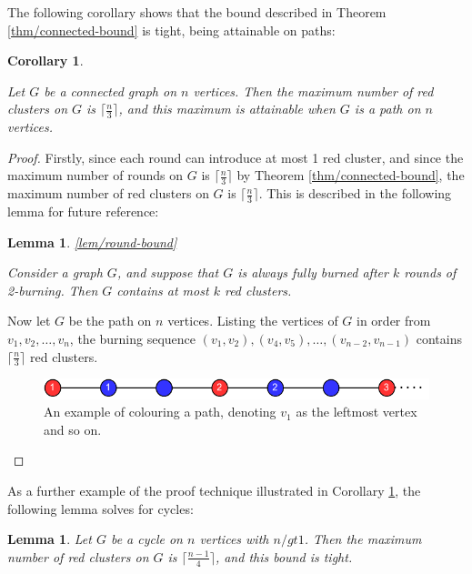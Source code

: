 \documentclass{mpaper}
\newtheorem{corollary}[theorem]{Corollary}
\newtheorem{lemma}[theorem]{Lemma}
\begin{document}
The following corollary shows that the bound described in Theorem \ref{thm/connected-bound} is tight, being attainable on paths:

\begin{corollary}
  \label{cor/path-clusters}

  Let $G$ be a connected graph on $n$ vertices. Then the maximum number of red clusters on $G$ is $\lceil \frac{n}{3} \rceil$, and this maximum is attainable when $G$ is a path on $n$ vertices.

\end{corollary}

\begin{proof}

Firstly, since each round can introduce at most 1 red cluster, and since the maximum number of rounds on $G$ is $\lceil \frac{n}{3} \rceil$ by Theorem \ref{thm/connected-bound}, the maximum number of red clusters on $G$ is $\lceil \frac{n}{3} \rceil$. This is described in the following lemma for future reference:

\begin{lemma}
  \ref{lem/round-bound}
  
  Consider a graph $G$, and suppose that $G$ is always fully burned after $k$ rounds of 2-burning. Then $G$ contains at most $k$ red clusters.
\end{lemma}

Now let $G$ be the path on $n$ vertices. Listing the vertices of $G$ in order from $v_1, v_2, \dots, v_n$, the burning sequence $(v_1, v_2), (v_4, v_5), \dots, (v_{n-2}, v_{n-1})$ contains $\lceil \frac{n}{3} \rceil$ red clusters.

\begin{figure}
    \centering
    \includegraphics[scale=0.65]{mpaper/figures/PathColouring.pdf}
    \caption{An example of colouring a path, denoting $v_1$ as the leftmost vertex and so on.}
    \label{fig/path-colouring}
\end{figure}

\end{proof}

As a further example of the proof technique illustrated in Corollary \ref{cor/path-clusters}, the following lemma solves \maxcluster for cycles:

\begin{lemma}
\label{lem/cycle-clusters}
  Let $G$ be a cycle on $n$ vertices with $n /gt 1$. Then the maximum number of red clusters on $G$ is $\lceil \frac{n-1}{4} \rceil$, and this bound is tight.
\end{lemma}
\end{document}
